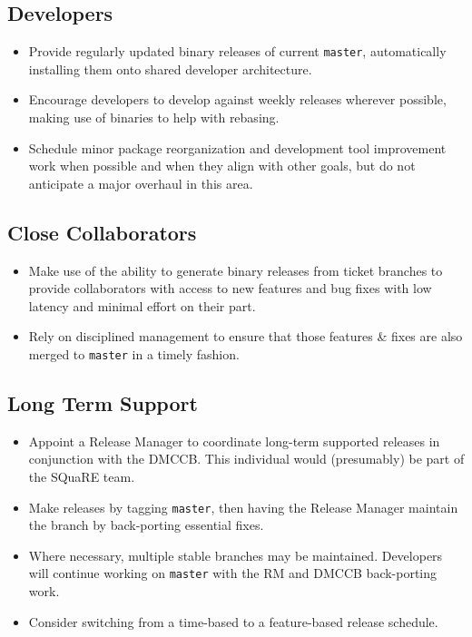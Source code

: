 \documentclass[DM,toc]{lsstdoc}
\begin{document}
\subsection{Developers}

\begin{itemize}

  \item{Provide regularly updated binary releases of current \texttt{master},
  automatically installing them onto shared developer architecture.}

  \item{Encourage developers to develop against weekly releases wherever
  possible, making use of binaries to help with rebasing.}

  \item{Schedule minor package reorganization and development tool improvement
  work when possible and when they align with other goals, but do not
  anticipate a major overhaul in this area.}

\end{itemize}

\subsection{Close Collaborators}

\begin{itemize}

  \item{Make use of the ability to generate binary releases from ticket
  branches to provide collaborators with access to new features and bug fixes
  with low latency and minimal effort on their part.}

  \item{Rely on disciplined management to ensure that those features \& fixes
  are also merged to \texttt{master} in a timely fashion.}

\end{itemize}

\subsection{Long Term Support}

\begin{itemize}

  \item{Appoint a Release Manager to coordinate long-term supported releases
  in conjunction with the DMCCB. This individual would (presumably) be part
  of the SQuaRE team.}

  \item{Make releases by tagging \texttt{master}, then having the Release
  Manager maintain the branch by back-porting essential fixes.}

  \item{Where necessary, multiple stable branches may be maintained.
  Developers will continue working on \texttt{master} with the RM and DMCCB
  back-porting work.}

  \item{Consider switching from a time-based to a feature-based release
  schedule.}

\end{itemize}
\end{document}
